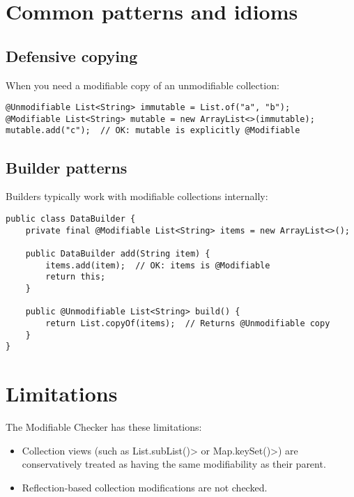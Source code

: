 \section{Common patterns and idioms\label{modifiable-patterns}}

\subsection{Defensive copying}

When you need a modifiable copy of an unmodifiable collection:

\begin{Verbatim}
@Unmodifiable List<String> immutable = List.of("a", "b");
@Modifiable List<String> mutable = new ArrayList<>(immutable);
mutable.add("c");  // OK: mutable is explicitly @Modifiable
\end{Verbatim}

\subsection{Builder patterns}

Builders typically work with modifiable collections internally:

\begin{Verbatim}
public class DataBuilder {
    private final @Modifiable List<String> items = new ArrayList<>();

    public DataBuilder add(String item) {
        items.add(item);  // OK: items is @Modifiable
        return this;
    }

    public @Unmodifiable List<String> build() {
        return List.copyOf(items);  // Returns @Unmodifiable copy
    }
}
\end{Verbatim}

\section{Limitations\label{modifiable-limitations}}

The Modifiable Checker has these limitations:

\begin{itemize}
\item Collection views (such as
      \<List.subList()> or \<Map.keySet()>) are conservatively
      treated as having the same modifiability as their parent.
\item Reflection-based collection modifications are not checked.
\end{itemize}

